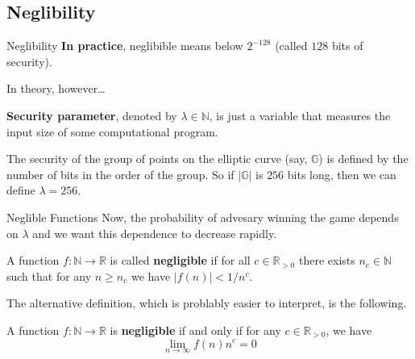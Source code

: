 \documentclass{beamer}
\begin{document}
    \subsection{Neglibility}

    \begin{frame}{Neglibility}
        \textbf{In practice}, neglibible means below $2^{-128}$ (called $128$ bits of security).

        In theory, however\ldots\pause

        \begin{definition}
            \textbf{Security parameter}, denoted by $\lambda \in \mathbb{N}$, is just a variable that measures the input size of some computational program.\pause
        \end{definition}

        \begin{example}
            The security of the group of points on the elliptic curve (say, $\mathbb{G}$) is defined by the number of bits in the order of the group. So if $|\mathbb{G}|$ is $256$ bits long, then we can define $\lambda = 256$.
        \end{example}
    \end{frame}

    \begin{frame}{Neglible Functions}
        Now, the probability of advesary winning the game depends on $\lambda$ and we want this dependence to decrease rapidly.

        \begin{definition}
            A function $f: \mathbb{N} \to \mathbb{R}$ is called \textbf{negligible} if for all $c \in \mathbb{R}_{>0}$ there exists $n_c \in \mathbb{N}$ such that for any $n \geq n_c$ we have $|f(n)| < 1/n^c$.\pause
        \end{definition}
        
        The alternative definition, which is problably easier to interpret, is the following.
        
        \begin{theorem}
            A function $f: \mathbb{N} \to \mathbb{R}$ is \textbf{negligible} if and only if for any $c \in \mathbb{R}_{>0}$, we have
            \begin{equation*}
                \lim_{n \to \infty} f(n)n^c = 0
            \end{equation*}
        \end{theorem}
    \end{frame}
\end{document}
